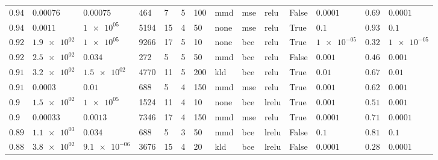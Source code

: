 \begin{landscape}
\begin{table}
\begin{tabular}{llllllllllllll}
$\num{ 0.94 }$ & $\num{ 0.00076 }$ & $\num{ 0.00075 }$ &          464 &              7 &        5 &              100 &         mmd &                 mse &                relu &     False & $\num{ 0.0001 }$ & $\num{ 0.69 }$ & $\num{ 0.0001 }$ \\
$\num{ 0.94 }$ &  $\num{ 0.0011 }$ &   $\num{ 1e+05 }$ &         5194 &             15 &        4 &               50 &        none &                 mse &                relu &      True &    $\num{ 0.1 }$ & $\num{ 0.93 }$ &    $\num{ 0.1 }$ \\
$\num{ 0.92 }$ & $\num{ 1.9e+02 }$ &   $\num{ 1e+05 }$ &         9266 &             17 &        5 &               10 &        none &                 bce &                relu &      True &  $\num{ 1e-05 }$ & $\num{ 0.32 }$ &  $\num{ 1e-05 }$ \\
$\num{ 0.92 }$ & $\num{ 2.5e+02 }$ &   $\num{ 0.034 }$ &          272 &              5 &        5 &               50 &         mmd &                 bce &                relu &     False &  $\num{ 0.001 }$ & $\num{ 0.46 }$ &  $\num{ 0.001 }$ \\
$\num{ 0.91 }$ & $\num{ 3.2e+02 }$ & $\num{ 1.5e+02 }$ &         4770 &             11 &        5 &              200 &         kld &                 bce &                relu &      True &   $\num{ 0.01 }$ & $\num{ 0.67 }$ &   $\num{ 0.01 }$ \\
$\num{ 0.91 }$ &  $\num{ 0.0003 }$ &    $\num{ 0.01 }$ &          688 &              5 &        4 &              150 &         mmd &                 mse &                relu &      True &  $\num{ 0.001 }$ & $\num{ 0.62 }$ &  $\num{ 0.001 }$ \\
 $\num{ 0.9 }$ & $\num{ 1.5e+02 }$ &   $\num{ 1e+05 }$ &         1524 &             11 &        4 &               10 &        none &                 bce &               lrelu &      True &  $\num{ 0.001 }$ & $\num{ 0.51 }$ &  $\num{ 0.001 }$ \\
 $\num{ 0.9 }$ & $\num{ 0.00033 }$ &  $\num{ 0.0013 }$ &         7346 &             17 &        4 &              150 &         mmd &                 mse &                relu &      True & $\num{ 0.0001 }$ & $\num{ 0.71 }$ & $\num{ 0.0001 }$ \\
$\num{ 0.89 }$ & $\num{ 1.1e+03 }$ &   $\num{ 0.034 }$ &          688 &              5 &        3 &               50 &         mmd &                 bce &               lrelu &     False &    $\num{ 0.1 }$ & $\num{ 0.81 }$ &    $\num{ 0.1 }$ \\
$\num{ 0.88 }$ & $\num{ 3.8e+02 }$ & $\num{ 9.1e-06 }$ &         3676 &             15 &        4 &               20 &         kld &                 bce &               lrelu &     False & $\num{ 0.0001 }$ & $\num{ 0.28 }$ & $\num{ 0.0001 }$ \\

\end{tabular}
\end{table}
\end{landscape}
